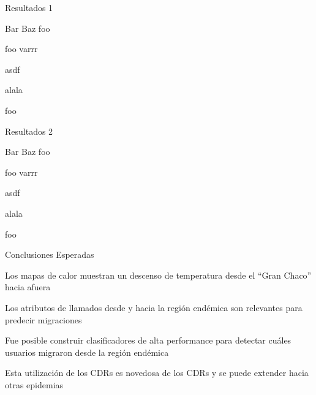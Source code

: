 \documentclass[xcolor=x11names]{beamer}
\begin{document}


\begin{frame}{Resultados 1}
	\begin{block}{Bar}
		Baz
		\medskip
		foo
	\end{block}


	\begin{block}{foo}
		varrr

		\medskip
			asdf

		\medskip
		alala

		\medskip
		foo
	\end{block}
\end{frame}


\begin{frame}{Resultados 2}
	\begin{block}{Bar}
		Baz
		\medskip
		foo
	\end{block}


	\begin{block}{foo}
		varrr

		\medskip
			asdf

		\medskip
		alala

		\medskip
		foo
	\end{block}
\end{frame}




\begin{frame}{Conclusiones Esperadas}

	Los mapas de calor muestran un descenso de temperatura desde el ``Gran Chaco'' hacia afuera

	\medskip
	Los atributos de llamados desde y hacia la región endémica son relevantes para predecir migraciones

	\medskip
	Fue posible construir clasificadores de alta performance para detectar cuáles usuarios migraron desde la región endémica

	\medskip

	Esta utilizaci\'on de los CDRs es novedosa de los CDRs y se puede extender hacia otras epidemias

\end{frame}
\end{document}
